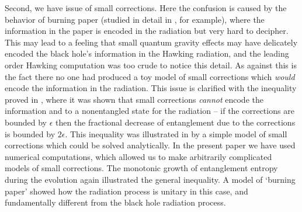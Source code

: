 \documentclass[12pt]{article}
\begin{document}
Second, we have issue of small corrections. Here the confusion is caused by the behavior of burning paper (studied in detail in \cite{page}, for example), where the information in the paper is encoded in the radiation but very hard to decipher. This may lead to a feeling that small quantum gravity effects may have delicately encoded the black hole's information in the Hawking radiation, and the leading order Hawking computation was too crude to notice this detail. As against this is the fact there no one had produced a toy model of small corrections which {\it would} encode the information in the radiation. This issue is clarified with the inequality proved in \cite{mathurfuzz}, where it was shown that small corrections {\it cannot} encode the information and  to a nonentangled state for the radiation -- if the corrections are bounded by $\epsilon$ then the fractional decrease of entanglement due to the corrections is bounded by $2\epsilon$. This inequality was illustrated in  \cite{mathurrecent} by a simple model of small corrections which could be solved analytically. In the present paper we have used numerical computations, which allowed us to make arbitrarily  complicated models of small corrections. The monotonic growth of entanglement entropy during the evolution again illustrated the general inequality. A model of `burning paper' showed how the radiation process is unitary in this case, and fundamentally  different from the black hole radiation process. 
\end{document}
